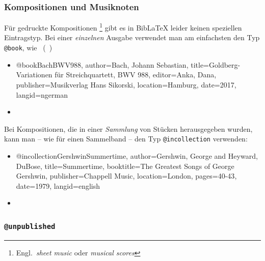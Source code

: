 
\subsubsection{Kompositionen und Musiknoten}
\label{sec:Musiknoten}

Für gedruckte Kompositionen%
\footnote{Engl.\ \emph{sheet music} oder \emph{musical scores}}
gibt es in BibLaTeX leider keinen speziellen Eintragstyp. Bei einer
\emph{einzelnen} Ausgabe verwendet man am einfachsten den Typ \texttt{@book},
wie \zB\ (\sa\ \cite{HaydnCelloConcerto2,ShostakovichOp110})
%
\begin{itemize}
\item[]
\begin{GenericCode}[numbers=none]
@book{BachBWV988,
  author={Bach, Johann Sebastian},
  title={Goldberg-Variationen für Streichquartett, BWV 988},
  editor={Anka, Dana},
  publisher={Musikverlag Hans Sikorski},
  location={Hamburg},
  date={2017},
  langid={ngerman}
}
\end{GenericCode}
\item[\cite{BachBWV988}] 
\end{itemize}
%
Bei Kompositionen, die in einer \emph{Sammlung} von Stücken herausgegeben
wurden, kann man -- wie für einen Sammelband -- den Typ
\texttt{@incollection} verwenden:
%
\begin{itemize}
\item[]
\begin{GenericCode}[numbers=none]
@incollection{GershwinSummertime,
  author={Gershwin, George and Heyward, DuBose},
  title={Summertime},
  booktitle={The Greatest Songs of George Gershwin},
  publisher={Chappell Music},
  location={London},
  pages={40-43},
  date={1979},
  langid={english}
}
\end{GenericCode}
\item[\cite{GershwinSummertime}] 
\end{itemize}

\subsubsection{\texttt{\bfseries @unpublished}}
\label{sec:@unpublished}

